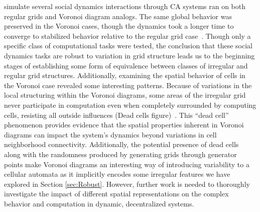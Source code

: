 \documentclass[a4paper,11pt]{report}
\begin{document}
\citeauthor{fl01} simulate several social dynamics interactions through CA systems ran on both regular grids and Voronoi diagram analogs. The same global behavior was preserved in the Voronoi cases, though the dynamics took a longer time to converge to stabilized behavior relative to the regular grid case~\cite{fl01}. Though only a specific class of computational tasks were tested, the conclusion that these social dynamics tasks are robust to variation in grid structure leads us to the beginning stages of establishing some form of equivalence between classes of irregular and regular grid structures. Additionally, examining the spatial behavior of cells in the Voronoi case revealed some interesting patterns. Because of variations in the local structuring within the Voronoi diagrams, some areas of the irregular grid never participate in computation even when completely surrounded by computing cells, resisting all outside influences (Dead cells figure)~\cite{fl01}. This ``dead cell'' phenomenon provides evidence that the spatial properties inherent in Voronoi diagrams can impact the system's dynamics beyond variations in cell neighborhood connectivity.
Additionally, the potential presence of dead cells along with the randomness produced by generating grids through generator points make Voronoi diagrams an interesting way of introducing variability to a cellular automata as it implicitly encodes some irregular features we have explored in Section \ref{sec:Robust}. However, further work is needed to thoroughly investigate the impact of different spatial representations on the complex behavior and computation in dynamic, decentralized systems. 
\end{document}

